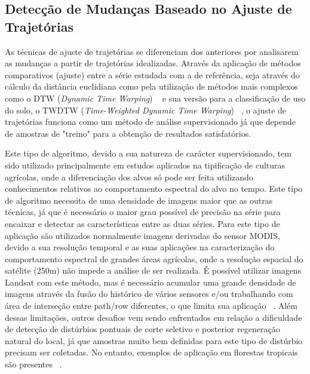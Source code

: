 \documentclass[twocolumn]{article}
\begin{document}
\subsection{Detecção de Mudanças Baseado no Ajuste de Trajetórias}
As técnicas de ajuste de trajetórias se diferenciam dos anteriores por analisarem as mudanças a partir de trajetórias idealizadas. Através da aplicação de métodos comparativos (ajuste) entre a série estudada com a de referência, seja através do cálculo da distância euclidiana como pela utilização de métodos mais complexos como o DTW (\textit{Dynamic Time Warping}) ~\cite{VELICHKO1970223, SakoeChiba71, Berndt1994} e sua versão para a classificação de uso do solo, o TWDTW (\textit{Time-Weighted Dynamic Time Warping}) ~\cite{Maus2016, Maus2019}, o ajuste de trajetórias funciona como um método de análise supervisionado já que depende de amostras de "treino" para a obtenção de resultados satisfatórios.
\par
Este tipo de algoritmo, devido a sua natureza de carácter supervisionado, tem sido utilizado principalmente em estudos aplicados na tipificação de culturas agrícolas, onde a diferenciação dos alvos só pode ser feita utilizando conhecimentos relativos ao comportamento espectral do alvo no tempo. Este tipo de algoritmo necessita de uma densidade de imagens maior que as outras técnicas, já que é necessário o maior grau possível de precisão na série para encaixar e detectar as características entre as duas séries. Para este tipo de aplicação são utilizados normalmente imagens derivadas do sensor MODIS, devido a sua resolução temporal e as suas aplicações na caracterização do comportamento espectral de grandes áreas agrícolas, onde a resolução espacial do satélite (250m) não impede a análise de ser realizada. É possível utilizar imagens Landsat com este método, mas é necessário acumular uma grande densidade de imagens através da fusão do histórico de vários sensores e/ou trabalhando com área de interseção entre path/row diferentes, o que limita sua aplicação ~\cite{Bendini2016}. Além dessas limitações, outros desafios vem sendo enfrentados em relação a dificuldade de 
detecção de distúrbios pontuais de corte seletivo e posterior regeneração natural do local, já que amostras muito bem definidas para este tipo de distúrbio precisam ser coletadas. No entanto, exemplos de aplicação em florestas tropicais são presentes ~\cite{Hirschmugl2013, KENNEDY2007370}.
\end{document}
